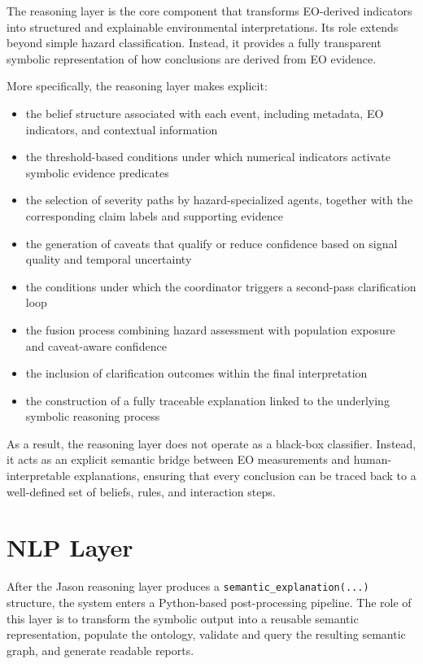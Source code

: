 \documentclass[12pt]{article}
\let\oldtexttt\texttt
\renewcommand{\texttt}[1]{{\fontsize{10.5}{12}\selectfont\oldtexttt{#1}}}
\begin{document}
The reasoning layer is the core component that transforms EO-derived indicators into structured and explainable environmental interpretations. Its role extends beyond simple hazard classification. Instead, it provides a fully transparent symbolic representation of how conclusions are derived from EO evidence.

More specifically, the reasoning layer makes explicit:

\begin{itemize}
\item the belief structure associated with each event, including metadata, EO indicators, and contextual information
\item the threshold-based conditions under which numerical indicators activate symbolic evidence predicates
\item the selection of severity paths by hazard-specialized agents, together with the corresponding claim labels and supporting evidence
\item the generation of caveats that qualify or reduce confidence based on signal quality and temporal uncertainty
\item the conditions under which the coordinator triggers a second-pass clarification loop
\item the fusion process combining hazard assessment with population exposure and caveat-aware confidence
\item the inclusion of clarification outcomes within the final interpretation
\item the construction of a fully traceable explanation linked to the underlying symbolic reasoning process
\end{itemize}

As a result, the reasoning layer does not operate as a black-box classifier. Instead, it acts as an explicit semantic bridge between EO measurements and human-interpretable explanations, ensuring that every conclusion can be traced back to a well-defined set of beliefs, rules, and interaction steps.

\section{NLP Layer}

After the Jason reasoning layer produces a \texttt{semantic\_explanation(...)} structure, the system enters a Python-based post-processing pipeline. The role of this layer is to transform the symbolic output into a reusable semantic representation, populate the ontology, validate and query the resulting semantic graph, and generate readable reports.
\end{document}
